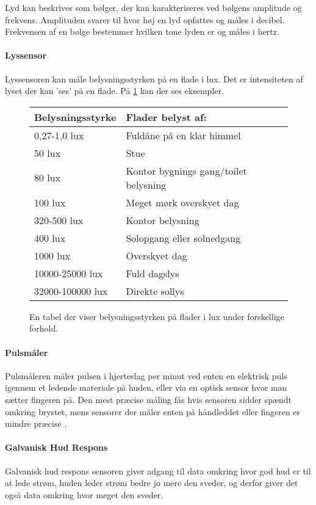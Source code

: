Lyd kan beskrives som bølger, der kan karakteriseres ved bølgens amplitude og frekvens.
Amplituden svarer til hvor høj en lyd opfattes og måles i decibel.
Frekvensen af en bølge bestemmer hvilken tone lyden er og måles i hertz. \cite{sound}


\paragraph{Lyssensor}
Lyssensoren kan måle belysningsstyrken på en flade i lux. Det er intensiteten af lyset der kan 'ses' på en flade. På \cref{fig:lux}  kan der ses eksempler.

\begin{figure}
	\centering
\begin{tabular}{ l | l}
	\textbf{Belysningsstyrke} & \textbf{Flader belyst af: }\\
\hline
0,27-1,0 lux &  Fuldåne på en klar himmel \\
\hline
50 lux & Stue \\
\hline
80 lux & Kontor bygnings gang/toilet belysning \\
\hline
100 lux & Meget mørk overskyet dag \\
\hline
320-500 lux & Kontor belysning \\
\hline
400 lux & Solopgang eller solnedgang \\
\hline
1000 lux & Overskyet dag \\
\hline
10000-25000 lux & Fuld dagslys \\
\hline
32000-100000 lux & Direkte sollys\\
\hline
\end{tabular}
\caption{En tabel der viser belysningsstyrken på flader i lux under forskellige forhold. \citep{misc:lux}}
\label{fig:lux}
\end{figure}

\paragraph{Pulsmåler}
Pulsmåleren måler pulsen i hjerteslag per minut ved enten en elektrisk puls igennem et ledende materiale på huden, eller via en optisk sensor hvor man sætter fingeren på.
Den mest præcise måling fås hvis sensoren sidder spændt omkring brystet, mens sensorer der måler enten på håndleddet eller fingeren er mindre præcise \cite{burke1998precision}.

\paragraph{Galvanisk Hud Respons}
Galvanisk hud respons sensoren giver adgang til data omkring hvor god hud er til at lede strøm, huden leder strøm bedre jo mere den sveder, og derfor giver det også data omkring hvor meget den sveder.